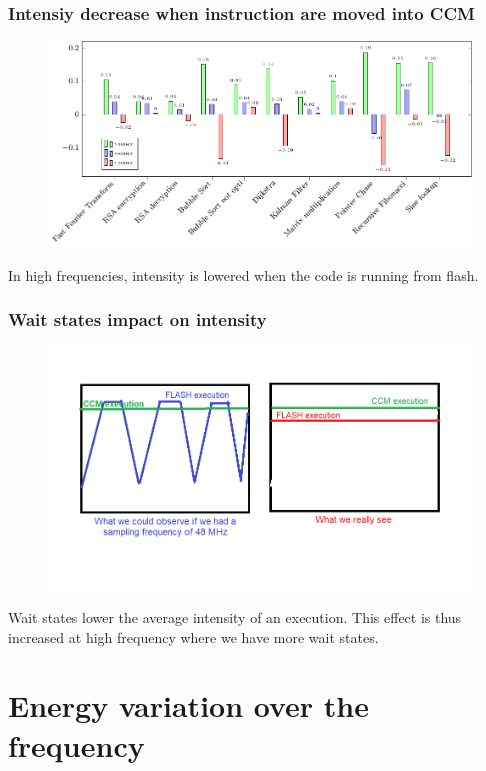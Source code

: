 \documentclass[
	11pt, %
]{beamer}
\begin{document}
\begin{frame}
	\frametitle{Intensiy decrease when instruction are moved into CCM}
	\begin{figure}
		\centering
        \includegraphics[scale=0.7]{plot/code_ccm_intensity.pdf}
	\end{figure}
	In high frequencies, intensity is lowered when the code is running from flash.
\end{frame}

\begin{frame}
	\frametitle{Wait states impact on intensity}
	\begin{figure}
		\centering
        \includegraphics[scale=0.7]{images/wait_state_impact.png}
	\end{figure}
	Wait states lower the average intensity of an execution. 
	This effect is thus increased at high frequency where we have more wait states.
\end{frame}

\section{Energy variation over the frequency}
\end{document}
